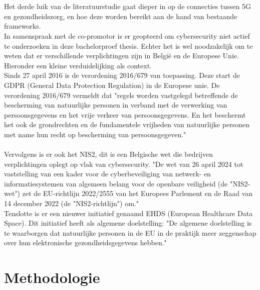 \\\\
Het derde luik van de literatuurstudie gaat dieper in op de connecties tussen 5G en gezondheidszorg, en hoe deze worden bereikt aan de hand van bestaande frameworks.
\\
In samenspraak met de co-promotor is er geopteerd om cybersecurity niet actief te onderzoeken in deze bachelorproef thesis. Echter het is wel noodzakelijk om te weten dat er verschillende verplichtingen zijn in België en de Europese Unie. Hieronder een kleine verduidelijking als context.
\\
Sinds 27 april 2016 is de verordening 2016/679 van toepassing. Deze start de GDPR (General Data Protection Regulation) in de Europese unie. De verordening 2016/679 vermeldt dat "regels worden vastgelegd betreffende de bescherming van natuurlijke personen in verband met de verwerking van persoonsgegevens en het vrije verkeer van persoonsgegevens. En het beschermt het ook de grondrechten en de fundamentele vrijheden van natuurlijke personen met name hun recht op bescherming van persoonsgegeven."\\ \autocite{gdpr2016} 
\\
Vervolgens is er ook het NIS2, dit is een Belgische wet die bedrijven verplichtingen oplegt op vlak van cybersecurity. "De wet van 26 april 2024 tot vaststelling van een kader voor de cyberbeveiliging van netwerk- en informatiesystemen van algemeen belang voor de openbare veiligheid (de "NIS2-wet") zet de EU-richtlijn 2022/2555 van het Europees Parlement en de Raad van 14 december 2022 (de "NIS2-richtlijn") om." \autocite{Belgium2024}
\\
Tenslotte is er een nieuwer initiatief genaamd EHDS (European Healthcare Data Space). Dit initiatief heeft als algemene doelstelling: "De algemene doelstelling is te waarborgen dat natuurlijke personen in de EU in de praktijk meer zeggenschap over hun elektronische gezondheidsgegevens hebben." \autocite{EHDS2022}


\section{Methodologie}%
\label{sec:methodologie}

